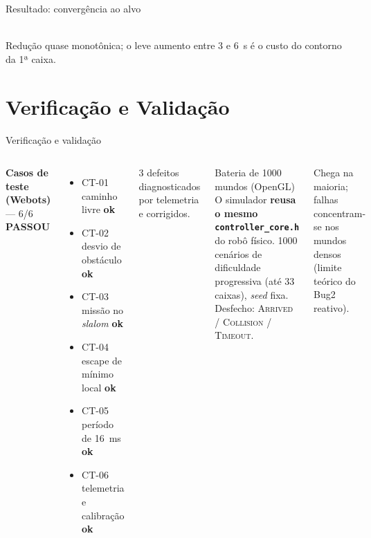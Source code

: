 \documentclass[aspectratio=169,11pt]{beamer}
\begin{document}
\begin{frame}{Resultado: convergência ao alvo}
\centering
{}\\
\footnotesize Redução quase monotônica; o leve aumento entre 3 e 6~s é o custo do contorno da 1ª caixa.
\end{frame}

\section{Verificação e Validação}
\begin{frame}{Verificação e validação}
\begin{columns}[T]
\textbf{Casos de teste (Webots)} --- 6/6 \textbf{PASSOU}
\begin{itemize}\scriptsize
  \item CT-01 caminho livre \hfill \textbf{ok}
  \item CT-02 desvio de obstáculo \hfill \textbf{ok}
  \item CT-03 missão no \emph{slalom} \hfill \textbf{ok}
  \item CT-04 escape de mínimo local \hfill \textbf{ok}
  \item CT-05 período de 16~ms \hfill \textbf{ok}
  \item CT-06 telemetria e calibração \hfill \textbf{ok}
\end{itemize}
\scriptsize 3 defeitos diagnosticados por telemetria e corrigidos.
\begin{block}{Bateria de 1000 mundos (OpenGL)}
\scriptsize O simulador \textbf{reusa o mesmo \texttt{controller\_core.h}} do robô físico. 1000 cenários de dificuldade progressiva (até 33 caixas), \emph{seed} fixa. Desfecho: \textsc{Arrived} / \textsc{Collision} / \textsc{Timeout}.
\end{block}
\scriptsize Chega na maioria; falhas concentram-se nos mundos densos (limite teórico do Bug2 reativo).
\end{columns}
\end{frame}
\end{document}
